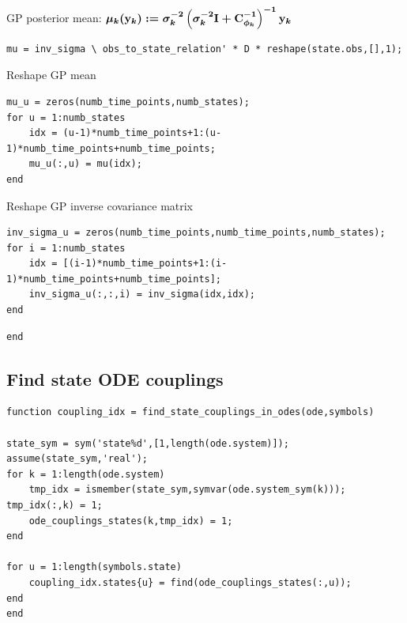 \color{black}
\begin{par}
GP posterior mean: $\boldmath\mu_k(\mathbf{y}_k) := \sigma_k^{-2} \left(\sigma_k^{-2} \mathbf{I} + \mathbf{C}_{\boldmath\phi_k}^{-1} \right)^{-1} \mathbf{y}_k$
\end{par} \vspace{1em}
\color{RoyalPurple}\begin{verbatim}
mu = inv_sigma \ obs_to_state_relation' * D * reshape(state.obs,[],1);
\end{verbatim}
\color{black}
\begin{par}
Reshape GP mean
\end{par} \vspace{1em}
\color{RoyalPurple}\begin{verbatim}
mu_u = zeros(numb_time_points,numb_states);
for u = 1:numb_states
    idx = (u-1)*numb_time_points+1:(u-1)*numb_time_points+numb_time_points;
    mu_u(:,u) = mu(idx);
end
\end{verbatim}
\color{black}
\begin{par}
Reshape GP inverse covariance matrix
\end{par} \vspace{1em}
\color{RoyalPurple}\begin{verbatim}
inv_sigma_u = zeros(numb_time_points,numb_time_points,numb_states);
for i = 1:numb_states
    idx = [(i-1)*numb_time_points+1:(i-1)*numb_time_points+numb_time_points];
    inv_sigma_u(:,:,i) = inv_sigma(idx,idx);
end
\end{verbatim}
\color{black}
\color{RoyalPurple}\begin{verbatim}
end
\end{verbatim}
\color{black}
\begin{par}
\section{ Find state ODE couplings }
\end{par} \vspace{1em}
\color{RoyalPurple}\begin{verbatim}
function coupling_idx = find_state_couplings_in_odes(ode,symbols)

state_sym = sym('state%d',[1,length(ode.system)]); assume(state_sym,'real');
for k = 1:length(ode.system)
    tmp_idx = ismember(state_sym,symvar(ode.system_sym(k))); tmp_idx(:,k) = 1;
    ode_couplings_states(k,tmp_idx) = 1;
end

for u = 1:length(symbols.state)
    coupling_idx.states{u} = find(ode_couplings_states(:,u));
end
end
\end{verbatim}
